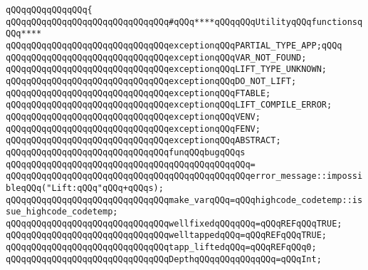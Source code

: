 \verb|qQQqqQQqqQQqqQQq{|\newline
\newline
\newline
\verb|qQQqqQQqqQQqqQQqqQQqqQQqqQQqqQQq#qQQq****qQQqqQQqUtilityqQQqfunctionsqQQq****|\newline
\newline
\newline
\verb|qQQqqQQqqQQqqQQqqQQqqQQqqQQqqQQqexceptionqQQqPARTIAL_TYPE_APP;qQQq|\newline
\verb|qQQqqQQqqQQqqQQqqQQqqQQqqQQqqQQqexceptionqQQqVAR_NOT_FOUND;|\newline
\verb|qQQqqQQqqQQqqQQqqQQqqQQqqQQqqQQqexceptionqQQqLIFT_TYPE_UNKNOWN;|\newline
\verb|qQQqqQQqqQQqqQQqqQQqqQQqqQQqqQQqexceptionqQQqDO_NOT_LIFT;|\newline
\verb|qQQqqQQqqQQqqQQqqQQqqQQqqQQqqQQqexceptionqQQqFTABLE;|\newline
\verb|qQQqqQQqqQQqqQQqqQQqqQQqqQQqqQQqexceptionqQQqLIFT_COMPILE_ERROR;|\newline
\verb|qQQqqQQqqQQqqQQqqQQqqQQqqQQqqQQqexceptionqQQqVENV;|\newline
\verb|qQQqqQQqqQQqqQQqqQQqqQQqqQQqqQQqexceptionqQQqFENV;|\newline
\verb|qQQqqQQqqQQqqQQqqQQqqQQqqQQqqQQqexceptionqQQqABSTRACT;|\newline
\newline
\verb|qQQqqQQqqQQqqQQqqQQqqQQqqQQqqQQqfunqQQqbugqQQqs|\newline
\verb|qQQqqQQqqQQqqQQqqQQqqQQqqQQqqQQqqQQqqQQqqQQqqQQq=|\newline
\verb|qQQqqQQqqQQqqQQqqQQqqQQqqQQqqQQqqQQqqQQqqQQqqQQqerror_message::impossibleqQQq("Lift:qQQq"qQQq+qQQqs);|\newline
\newline
\newline
\verb|qQQqqQQqqQQqqQQqqQQqqQQqqQQqqQQqmake_varqQQq=qQQqhighcode_codetemp::issue_highcode_codetemp;|\newline
\newline
\verb|qQQqqQQqqQQqqQQqqQQqqQQqqQQqqQQqwellfixedqQQqqQQq=qQQqREFqQQqTRUE;|\newline
\verb|qQQqqQQqqQQqqQQqqQQqqQQqqQQqqQQqwelltappedqQQq=qQQqREFqQQqTRUE;|\newline
\verb|qQQqqQQqqQQqqQQqqQQqqQQqqQQqqQQqtapp_liftedqQQq=qQQqREFqQQq0;|\newline
\newline
\verb|qQQqqQQqqQQqqQQqqQQqqQQqqQQqqQQqDepthqQQqqQQqqQQqqQQq=qQQqInt;|\newline
